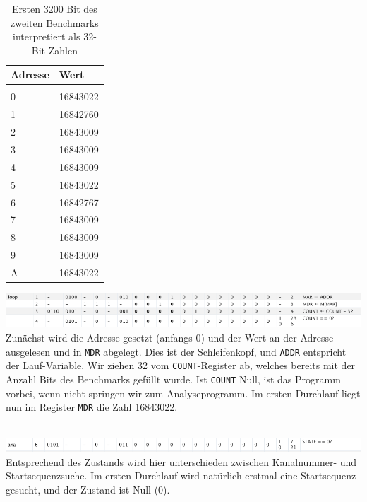 \documentclass[12pt,titlepage]{article}
\begin{document}
\begin{table}[h!]
    \begin{tabular}{l|l}
    Adresse & Wert            \\
    \hline                    \\
    0     & 16843022  \\
    1     & 16842760  \\
    2     & 16843009  \\
    3     & 16843009  \\
    4     & 16843009  \\
    5     & 16843022  \\
    6     & 16842767  \\
    7     & 16843009  \\
    8     & 16843009  \\
    9     & 16843009  \\
    A     & 16843022  \\
    \end{tabular}
    \caption{Ersten 3200 Bit des zweiten Benchmarks interpretiert als 32-Bit-Zahlen}
\end{table}


\includegraphics[width=16cm]{listing/row1-4.png}
\leavevmode \\

Zunächst wird die Adresse gesetzt (anfangs 0) und der Wert an der Adresse ausgelesen und in \texttt{MDR} abgelegt.
Dies ist der Schleifenkopf, und \texttt{ADDR} entspricht der Lauf-Variable.
Wir ziehen 32 vom \texttt{COUNT}-Register ab, welches bereits mit der Anzahl Bits des Benchmarks gefüllt wurde.
Ist \texttt{COUNT} Null, ist das Programm vorbei, wenn nicht springen wir zum Analyseprogramm.
Im ersten Durchlauf liegt nun im Register \texttt{MDR} die Zahl 16843022.

\leavevmode \\
\includegraphics[width=16cm]{listing/row6.png}
\leavevmode \\

Entsprechend des Zustands wird hier unterschieden zwischen Kanalnummer- und Startsequenzsuche. Im ersten Durchlauf
wird natürlich erstmal eine Startsequenz gesucht, und der Zustand ist Null (0).
\end{document}
